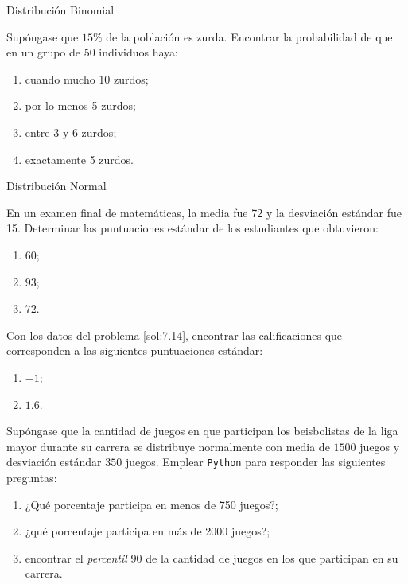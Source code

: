 {Distribución Binomial}
 \begin{ejemplo}
  \label{sol:0.7.2}
  Supóngase que $15\%$ de la población es zurda. Encontrar la probabilidad de que en un grupo de 50 individuos haya:
  \begin{enumerate}
   \item cuando mucho 10 zurdos; 
   \item por lo menos 5 zurdos; 
   \item entre 3 y 6 zurdos; 
   \item exactamente 5 zurdos.
  \end{enumerate}

 \end{ejemplo}






{Distribución Normal}
 \begin{ejemplo}
  \label{sol:0.7.14}
  En un examen final de matemáticas, la media fue 72 y la desviación estándar fue 15. Determinar las puntuaciones estándar de los estudiantes que obtuvieron:
  \begin{enumerate}
   \item $60$;
   \item $93$;
   \item $72$.
  \end{enumerate}

 \end{ejemplo}



 \begin{ejemplo}
  \label{sol:0.7.15}
  Con los datos del problema \ref{sol:7.14}, encontrar las calificaciones que corresponden a las siguientes puntuaciones estándar:
  \begin{enumerate}
   \item $-1$;
   \item $1.6$.
  \end{enumerate}

 \end{ejemplo}



 \begin{ejemplo}
  \label{sol:0.7.16}
  Supóngase que la cantidad de juegos en que participan los beisbolistas de la liga mayor durante su carrera se distribuye normalmente con media de $1500$ juegos y desviación estándar $350$ juegos. Emplear \texttt{Python} para responder las siguientes preguntas:
  \begin{enumerate}
   \item ¿Qué porcentaje participa en menos de 750 juegos?;
   \item ¿qué porcentaje participa en más de 2000 juegos?;
   \item encontrar el \emph{percentil} $90$ de la cantidad de juegos en los que participan en su carrera.
  \end{enumerate}

 \end{ejemplo}


